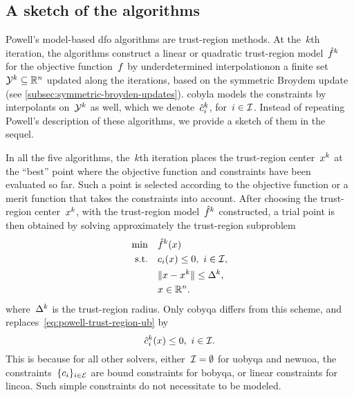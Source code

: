 \subsection{A sketch of the algorithms}

Powell's model-based \gls{dfo} algorithms are trust-region methods.
At the~$k$th iteration, the algorithms construct a linear or quadratic trust-region model~$\objm[k]$ for the objective function~$f$ by underdetermined interpolationon a finite set~$\xpt[k] \subseteq \R^n$ updated along the iterations, based on the symmetric Broydem update (see \cref{subsec:symmetric-broyden-updates}).
\Gls{cobyla} models the constraints by interpolants on~$\xpt[k]$ as well, which we denote~$\conm[k]{i}$, for~$i \in \mathcal{I}$.
Instead of repeating Powell's description of these algorithms, we provide a sketch of them in the sequel.

In all the five algorithms, the~$k$th iteration places the trust-region center~$\iter[k]$ at the \enquote{best} point where the objective function and constraints have been evaluated so far.
Such a point is selected according to the objective function or a merit function that takes the constraints into account.
After choosing the trust-region center~$\iter[k]$, with the trust-region model~$\objm[k]$ constructed, a trial point is then obtained by solving approximately the trust-region subproblem
\begin{subequations}
    \label{eq:powell-trust-region}
    \begin{align}
        \min        & \quad \objm[k](\iter)\\
        \text{s.t.} & \quad \con{i}(\iter) \le 0, ~ i \in \iub, \label{eq:powell-trust-region-ub}\\
                    & \quad \norm{\iter - \iter[k]} \le \rad[k],\\
                    & \quad \iter \in \R^n. \nonumber
    \end{align}
\end{subequations}
where~$\rad[k]$ is the trust-region radius.
Only \gls{cobyqa} differs from this scheme, and replaces~\cref{eq:powell-trust-region-ub} by
\begin{equation*}
    \conm[k]{i}(\iter) \le 0, ~ i \in \iub.
\end{equation*}
This is because for all other solvers, either~$\mathcal{I} = \emptyset$ for \gls{uobyqa} and \gls{newuoa}, the constraints~$\{c_{i}\}_{i \in \mathcal{E}}$ are bound constraints for \gls{bobyqa}, or linear constraints for \gls{lincoa}.
Such simple constraints do not necessitate to be modeled.

